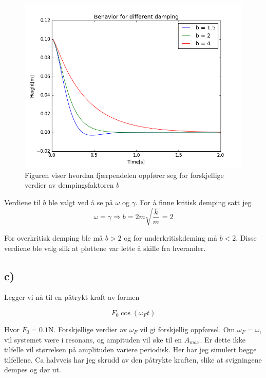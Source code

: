 \documentclass[a4paper,norsk, 10pt]{article}
\begin{document}
\begin{figure}[H]
\centering
\includegraphics[scale=0.4]{diffdemp.png}
\caption{Figuren viser hvordan fjærpendelen oppfører seg for forskjellige verdier av dempingsfaktoren $b$}
\label{diffdemp}
\end{figure}

Verdiene til $b$ ble valgt ved å se på $\omega$ og $\gamma$. For å finne kritisk demping satt jeg 
$$
\omega = \gamma \Rightarrow b = 2m\sqrt{\frac{k}{m}} = 2
$$

For overkritisk demping ble må $b>2$ og for underkritiskdeming må $b<2$. Disse verdiene ble valg slik at plottene var lette å skille fra hverander.

\subsection*{c)}

Legger vi nå til en påtrykt kraft av formen

$$
F_0\cos(\omega_F t)
$$

Hvor $F_0 = 0.1$N. Forskjellige verdier av $\omega_F$ vil gi forskjellig oppførsel. Om $\omega_F = \omega$, vil systemet være i resonans, og ampituden vil øke til en $A_{max}$. Er dette ikke tilfelle vil størrelsen på amplituden variere periodisk. Her har jeg simulert begge tilfellene. Ca halvveis har jeg skrudd av den påtrykte kraften, slike at svigningene dempes og dør ut.
\end{document}
